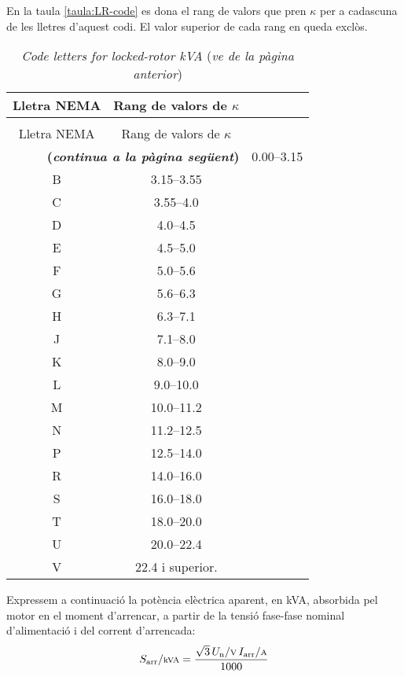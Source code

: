 En la taula \vref{taula:LR-code} es dona el rang de valors que pren $\kappa$ per a cadascuna de les lletres d'aquest codi. El valor superior de cada rang en queda exclòs.

\begin{longtable}[h]{cc}
	\caption{\label{taula:LR-code} \textit{Code letters for locked-rotor kVA}}\\
	\toprule[1pt]
	Lletra NEMA & Rang de valors de $\kappa$\\
	\midrule
	\endfirsthead
	\caption[]{\textit{Code letters for locked-rotor kVA} (\emph{ve de la pàgina anterior})}\\
	\toprule[1pt]
	Lletra NEMA & Rang de valors de $\kappa$\\
	\midrule
	\endhead
	\midrule
	\multicolumn{2}{r}{\sffamily\bfseries\color{NavyBlue}(\emph{continua a la pàgina següent})}
	\endfoot
	\endlastfoot
	A & \numrange{0,00}{3,15} \\
	B & \numrange{3,15}{3,55} \\
	C & \numrange{3,55}{4,0} \\
	D & \numrange{4,0}{4,5} \\
	E & \numrange{4,5}{5,0} \\
	F & \numrange{5,0}{5,6} \\
	G & \numrange{5,6}{6,3} \\
	H & \numrange{6,3}{7,1} \\
	J & \numrange{7,1}{8,0}\\
	K & \numrange{8,0}{9,0} \\
	L & \numrange{9,0}{10,0} \\
	M & \numrange{10,0}{11,2} \\
	N & \numrange{11,2}{12,5} \\
	P & \numrange{12,5}{14,0} \\
	R & \numrange{14,0}{16,0} \\
	S & \numrange{16,0}{18,0} \\
	T & \numrange{18,0}{20,0} \\
	U & \numrange{20,0}{22,4} \\
	V & \num{22,4} i superior. \\
	\bottomrule[1pt]
\end{longtable}
              

Expressem a continuació la potència elèctrica aparent, en kVA, absorbida pel motor en el moment d'arrencar, a partir de la tensió fase-fase nominal d'alimentació i del corrent d'arrencada:
\begin{equation}
    S\ped{arr}/{\scriptstyle \unit{kVA}} = \frac{\sqrt{3}\,U\ped{n}/{\scriptstyle \unit{V}}\,I\ped{arr}/{\scriptstyle \unit{A}}}{1000}
\end{equation}

